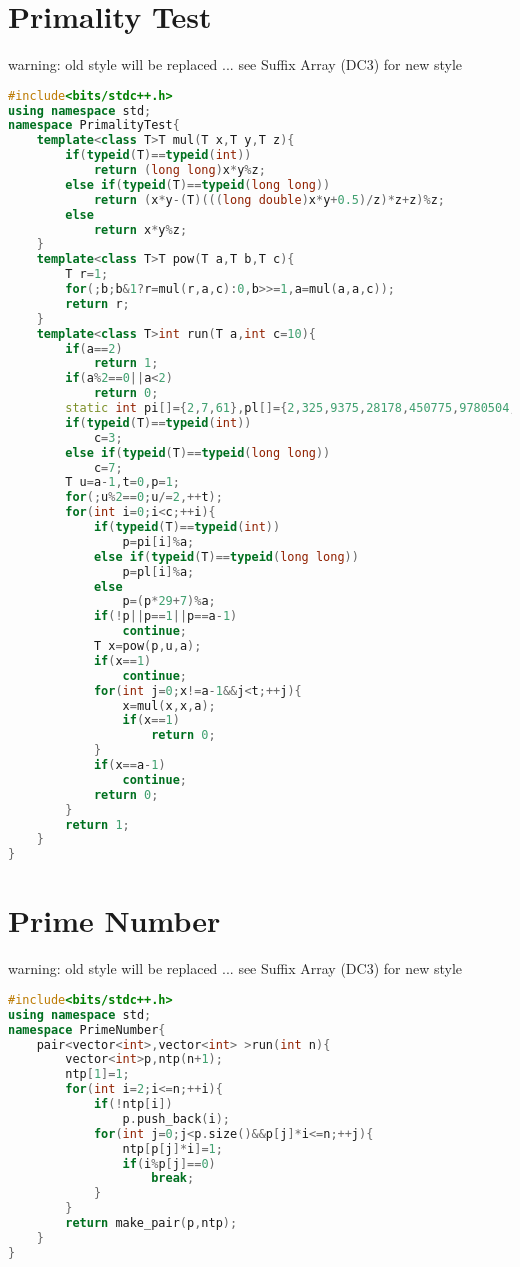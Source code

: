 \documentclass{book}
\begin{document}
\section{Primality Test}
warning: old style will be replaced ... see Suffix Array (DC3) for new style\begin{lstlisting}[language=C++,title={Primality Test.hpp (1509 bytes, 52 lines)}]
#include<bits/stdc++.h>
using namespace std;
namespace PrimalityTest{
    template<class T>T mul(T x,T y,T z){
        if(typeid(T)==typeid(int))
            return (long long)x*y%z;
        else if(typeid(T)==typeid(long long))
            return (x*y-(T)(((long double)x*y+0.5)/z)*z+z)%z;
        else
            return x*y%z;
    }
    template<class T>T pow(T a,T b,T c){
        T r=1;
        for(;b;b&1?r=mul(r,a,c):0,b>>=1,a=mul(a,a,c));
        return r;
    }
    template<class T>int run(T a,int c=10){
        if(a==2)
            return 1;
        if(a%2==0||a<2)
            return 0;
        static int pi[]={2,7,61},pl[]={2,325,9375,28178,450775,9780504,1795265022};
        if(typeid(T)==typeid(int))
            c=3;
        else if(typeid(T)==typeid(long long))
            c=7;
        T u=a-1,t=0,p=1;
        for(;u%2==0;u/=2,++t);
        for(int i=0;i<c;++i){
            if(typeid(T)==typeid(int))
                p=pi[i]%a;
            else if(typeid(T)==typeid(long long))
                p=pl[i]%a;
            else
                p=(p*29+7)%a;
            if(!p||p==1||p==a-1)
                continue;
            T x=pow(p,u,a);
            if(x==1)
                continue;
            for(int j=0;x!=a-1&&j<t;++j){
                x=mul(x,x,a);
                if(x==1)
                    return 0;
            }
            if(x==a-1)
                continue;
            return 0;
        }
        return 1;
    }
}
\end{lstlisting}
\section{Prime Number}
warning: old style will be replaced ... see Suffix Array (DC3) for new style\begin{lstlisting}[language=C++,title={Prime Number.hpp (473 bytes, 18 lines)}]
#include<bits/stdc++.h>
using namespace std;
namespace PrimeNumber{
    pair<vector<int>,vector<int> >run(int n){
        vector<int>p,ntp(n+1);
        ntp[1]=1;
        for(int i=2;i<=n;++i){
            if(!ntp[i])
                p.push_back(i);
            for(int j=0;j<p.size()&&p[j]*i<=n;++j){
                ntp[p[j]*i]=1;
                if(i%p[j]==0)
                    break;
            }
        }
        return make_pair(p,ntp);
    }
}
\end{lstlisting}
\end{document}

